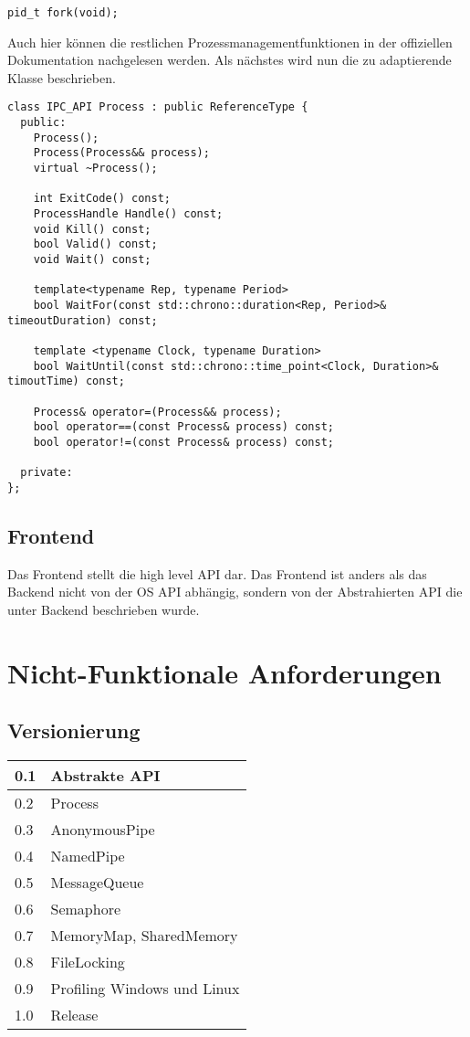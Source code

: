 \documentclass[a4paper]{book}
\begin{document}
\lstset{language=[GNU]C++}
\begin{lstlisting}[caption={fork},frame=single]
pid_t fork(void);
\end{lstlisting}

\noindent Auch hier können die restlichen Prozessmanagementfunktionen in der offiziellen Dokumentation nachgelesen werden. Als nächstes wird nun die zu adaptierende Klasse beschrieben.

\lstset{language=C++,breaklines=true}
\begin{lstlisting}[caption={class Process},frame=single]
class IPC_API Process : public ReferenceType {
  public:
    Process();
    Process(Process&& process);
    virtual ~Process();
    
    int ExitCode() const;
    ProcessHandle Handle() const;
    void Kill() const;
    bool Valid() const;
    void Wait() const;
    
    template<typename Rep, typename Period>
    bool WaitFor(const std::chrono::duration<Rep, Period>& timeoutDuration) const;
    
    template <typename Clock, typename Duration>
    bool WaitUntil(const std::chrono::time_point<Clock, Duration>& timoutTime) const;
    
    Process& operator=(Process&& process);
    bool operator==(const Process& process) const;
    bool operator!=(const Process& process) const;
    
  private:
};
\end{lstlisting}

\subsection{Frontend}
Das Frontend stellt die high level API dar. Das Frontend ist anders als das Backend nicht von der OS API abhängig, sondern von der Abstrahierten API die unter Backend beschrieben wurde.

\section{Nicht-Funktionale Anforderungen}
\subsection{Versionierung}
\begin{center}
\begin{longtable}{|p{3cm}|p{8cm}|}
\hline
0.1 & Abstrakte API \\
\hline
0.2 & Process \\
\hline
0.3 & AnonymousPipe \\
\hline
0.4 & NamedPipe \\
\hline 
0.5 & MessageQueue \\
\hline
0.6 & Semaphore \\
\hline
0.7 & MemoryMap, SharedMemory \\
\hline
0.8 & FileLocking \\
\hline
0.9 & Profiling Windows und Linux\\
\hline
1.0 & Release \\
\hline
\end{longtable}
\end{center}
\end{document}
